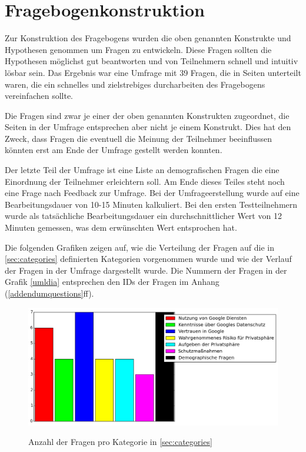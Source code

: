 \section{Fragebogenkonstruktion}
Zur Konstruktion des Fragebogens wurden die oben genannten Konstrukte und Hypothesen genommen um Fragen zu entwickeln. Diese Fragen sollten die Hypothesen möglichst gut beantworten und von Teilnehmern schnell und intuitiv lösbar sein. Das Ergebnis war eine Umfrage mit 39 Fragen, die in Seiten unterteilt waren, die ein schnelles und zielstrebiges durcharbeiten des Fragebogens vereinfachen sollte. 

Die Fragen sind zwar je einer der oben genannten Konstrukten zugeordnet, die Seiten in der Umfrage entsprechen aber nicht je einem Konstrukt. Dies hat den Zweck, dass Fragen die eventuell die Meinung der Teilnehmer beeinflussen könnten erst am Ende der Umfrage gestellt werden konnten.

Der letzte Teil der Umfrage ist eine Liste an demografischen Fragen die eine Einordnung der Teilnehmer erleichtern soll. Am Ende dieses Teiles steht noch eine Frage nach Feedback zur Umfrage.
Bei der Umfrageerstellung wurde auf eine Bearbeitungsdauer von 10-15 Minuten kalkuliert. Bei den ersten Testteilnehmern wurde als tatsächliche Bearbeitungsdauer ein durchschnittlicher Wert von 12 Minuten gemessen, was dem erwünschten Wert entsprochen hat.

Die folgenden Grafiken zeigen auf, wie die Verteilung der Fragen auf die in \ref{sec:categories} definierten Kategorien vorgenommen wurde und wie der Verlauf der Fragen in der Umfrage dargestellt wurde. Die Nummern der Fragen in der Grafik \ref{umldia} entsprechen den IDs der Fragen im Anhang (\ref{addendumquestions}ff). 

\begin{figure}[H]
\centering
\includegraphics[width=\textwidth]{images/zahlenkategorien}\\
\caption{Anzahl der Fragen pro Kategorie in \ref{sec:categories}}\label{catnumbers}
\end{figure}


